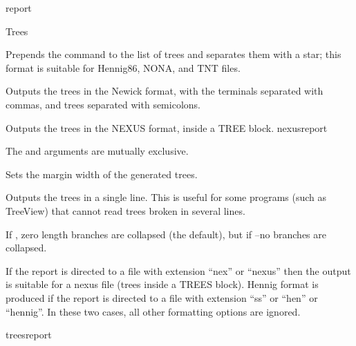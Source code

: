\begin{command}{report}{}
\begin{arguments}
\begin{argumentgroup}{Trees}
{\begin{description}
                        {Prepends the  command to the list of
                        trees and separates them with a star; this format is
                        suitable for Hennig86, NONA, and TNT files.}
                        {}
                        
                        {Outputs the trees in the Newick format, with the
                        terminals separated with commas, and trees separated
                        with semicolons.}
                        {}
                        
                        {Outputs the trees in the NEXUS format, inside a TREE block.}
                        {nexusreport}
                    
                    \begin{statement}
                     The  and  arguments are 
                     mutually exclusive.
                     \end{statement}
	     
                        {Sets the margin width of the generated trees.}
                        {}

                        {Outputs the trees in a single line. This is useful for
                        some programs (such as TreeView) that cannot read
                        trees broken in several
                        lines.}
                        {}

                        {If , zero length branches are collapsed (the
                        default), but if --no branches are
                        collapsed.}
                        {}
                    \end{description}
                If the report is directed
                to a file with extension ``nex'' or ``nexus'' then
                the output is suitable for a nexus file (trees inside a TREES
                block). Hennig format is produced if the report is directed
                to a file with extension ``ss'' or ``hen'' or ``hennig''. In
                these two cases, all other formatting options are ignored.}
                {treesreport}


\end{argumentgroup}
\end{arguments}
\end{command}
